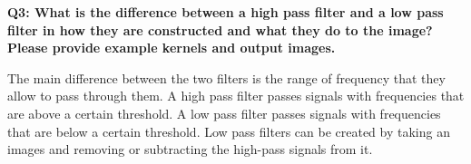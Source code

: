 \documentclass[12pt]{article}
\begin{document}
\textbf{Q3: What is the difference between a high pass filter and a low pass filter in how they
are constructed and what they do to the image? Please provide example kernels and output
images.} 

The main difference between the two filters is the range of frequency that they allow to pass through them.
A high pass filter passes signals with frequencies that are above a certain threshold.
A low pass filter passes signals with frequencies that are below a certain threshold.
Low pass filters can be created by taking an images and removing or subtracting the 
high-pass signals from it.
\end{document}
